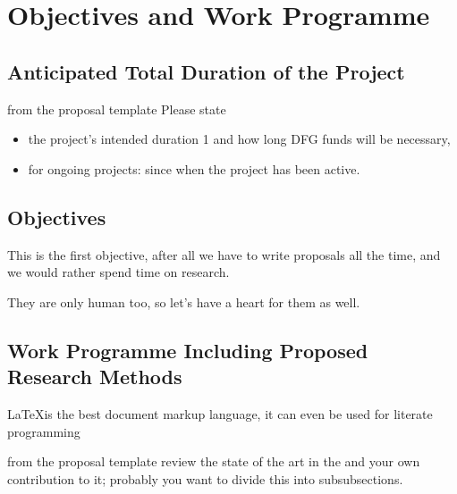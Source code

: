 \section{Objectives and Work Programme}\label{sec:workplan}

\subsection{Anticipated Total Duration of the Project}\label{sec:duration}

\begin{todo}{from the proposal template}
Please state
\begin{itemize}
 \item the project's intended duration 1 and how long DFG funds will be necessary,
 \item for ongoing projects: since when the project has been active.
\end{itemize}
\end{todo}

\subsection{Objectives}\label{sec:objectives}

\begin{objective}[id=firstobj,title=Supporting Authors]
  This is the first objective, after all we have to write proposals all the time, and we
  would rather spend time on research. 
\end{objective}

\begin{objective}[id=secondobj,title=Supporting Reviewers]
  They are only human too, so let's have a heart for them as well. 
\end{objective}


\subsection{Work Programme Including Proposed Research Methods}\label{sec:wawp}

\LaTeX is the best document markup language, it can even be used for literate
programming~\cite{DK:LP,Lamport:ladps94,Knuth:ttb84}

\begin{todo}{from the proposal template}
 review the state of the art in the and your own contribution to it; probably you want to
  divide this into subsubsections. 
\end{todo}

